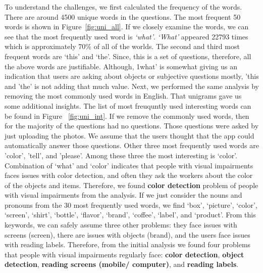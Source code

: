 \documentclass[sigconf]{acmart}
\begin{document}
To understand the challenges, we first calculated the frequency of the words. There are around 4500 unique words in the questions. The most frequent 50 words is shown in Figure~\ref{fig:uni_all}.  If we closely examine the words, we can see that the most frequently used word is \emph{`what'}. \emph{`What'} appeared 22793 times which is approximately 70\% of all of the worlds. The second and third most frequent words are `this' and `the'. Since, this is a set of questions, therefore, all the above words are justifiable.  Although, 1what' is somewhat giving us an indication that users are asking about objects or subjective questions mostly, 'this and 'the' is not adding that much value.  Next, we performed the same analysis by removing the most commonly used words in English. That unigrams gave us some additional insights. The list of most freuquntly used interesting words can be found in Figure ~\ref{fig:uni_int}.  If we remove the commonly used words, then for the majority of the questions had no questions. Those questions were asked by just uploading the photos.  We assume that the users thought that the app could automatically answer those questions. Other three most frequently used words are 'color', 'tell', and 'please'. Among these three the most interesting is `color'. Combination of `what' and `color' indicates that people with visual impairments faces issues with color detection, and often they ask the workers about the color of the objects and items.  Therefore, we found \textbf{color detection} problem of people with visual impairments from the analysis.  If we just consider the nouns and pronouns from the 30 most frequently used words, we find `box', `picture', `color', `screen', `shirt', `bottle', `flavor', `brand', `coffee', `label', and `product'. From this keywords, we can safely assume three other problems: they face issues with screens (screen), there are issues with objects (brand), and the users face issues with reading labels. Therefore, from the initial analysis we found four problems that people with visual impairments regularly face: \textbf{color detection}, \textbf{object detection}, \textbf{reading screens (mobile/ computer)}, and \textbf{reading labels}. 
\end{document}
